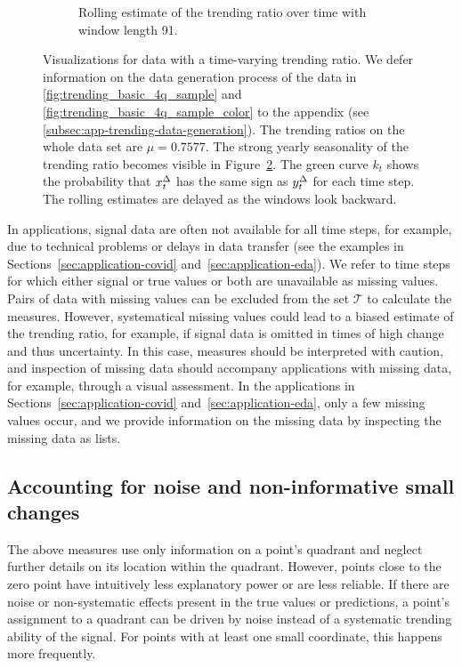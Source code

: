 \begin{figure}
\begin{subfigure}[t]{.48\textwidth}
    \caption{Rolling estimate of the trending ratio over time with window length 91. }\label{fig:trending_ratio_time_series}
    \end{subfigure}%
    \caption{Visualizations for data with a time-varying trending ratio. We defer information on the data generation process of the data in \ref{fig:trending_basic_4q_sample} and \ref{fig:trending_basic_4q_sample_color} to the appendix (see \ref{subsec:app-trending-data-generation}). The trending ratios on the whole data set are $\mu = 0.7577$. The strong yearly seasonality of the trending ratio becomes visible in Figure~\ref{fig:trending_ratio_time_series}. The green curve $k_t$ shows the probability that $x^{\Delta}_{t}$ has the same sign as $y^{\Delta}_{t}$ for each time step. The rolling estimates are delayed as the windows look backward.}
\end{figure} 
In applications, signal data are often not available for all time steps, for example, due to technical problems or delays in data transfer (see the examples in Sections~\ref{sec:application-covid} and~\ref{sec:application-eda}).
We refer to time steps for which either signal or true values or both are unavailable as missing values.
Pairs of data with missing values can be excluded from the set $\mathcal{T}$ to calculate the measures. 
However, systematical missing values could lead to a biased estimate of the trending ratio, for example, if signal data is omitted in times of high change and thus uncertainty.
In this case, measures should be interpreted with caution, and
inspection of missing data should accompany applications with missing data, for example, through a visual assessment.
In the applications in Sections~\ref{sec:application-covid} and~\ref{sec:application-eda}, only a few missing values occur, and we provide information on the missing data by inspecting the missing data as lists.

\subsection{Accounting for noise and non-informative small changes}\label{subsec:trending-noise}

The above measures use only information on a point's quadrant and neglect further details on its location within the quadrant.
However, points close to the zero point have intuitively less explanatory power or are less reliable.
If there are noise or non-systematic effects present in the true values or predictions, a point's assignment to a quadrant can be driven by noise instead of a systematic trending ability of the signal.
For points with at least one small coordinate, this happens more frequently.

